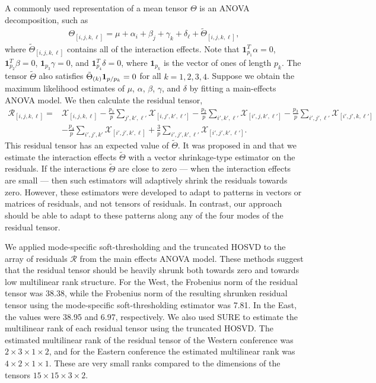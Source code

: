 A commonly used representation of a mean tensor $\Theta$ is an ANOVA
decomposition, such as
\begin{align*}
  \Theta_{[i,j,k,\ell]} = \mu + \alpha_i + \beta_j + \gamma_k + \delta_{\ell} + \tilde{\Theta}_{[i,j,k,\ell]},
\end{align*}
where $\tilde{\Theta}_{[i,j,k,\ell]}$ contains all of the interaction
effects. Note that $\mathbf{1}_{p_1}^T\alpha = 0$,
$\mathbf{1}_{p_2}^T\beta = 0$, $\mathbf{1}_{p_3}\gamma = 0$, and
$\mathbf{1}_{p_4}^T\delta = 0$, where $\mathbf{1}_{p_k}$ is the vector
of ones of length $p_k$. The tensor $\tilde{\Theta}$ also satisfies
$\Tilde{\Theta}_{(k)}\mathbf{1}_{p/p_k} = 0$ for all $k =
1,2,3,4$. Suppose we obtain the maximum likelihood estimates of $\mu$,
$\alpha$, $\beta$, $\gamma$, and $\delta$ by fitting a main-effects
ANOVA model. We then calculate the residual tensor,
\begin{align*}
  \mathcal{R}_{[i,j,k,\ell]} =& \mathcal{X}_{[i,j,k,\ell]} -
  \frac{p_1}{p}\sum_{j',k',\ell'}\mathcal{X}_{[i,j',k',\ell']} -
  \frac{p_2}{p}\sum_{i',k',\ell'}\mathcal{X}_{[i',j,k',\ell']} -
  \frac{p_3}{p}\sum_{i',j',\ell'}\mathcal{X}_{[i',j',k,\ell']} \\
  &- \frac{p_4}{p}\sum_{i',j',k'}\mathcal{X}_{[i',j',k',\ell]} + \frac{3}{p}\sum_{i',j',k',\ell'}\mathcal{X}_{[i',j',k',\ell']}.
\end{align*}
This residual tensor has an expected value of $\tilde{\Theta}$.  It
was proposed in \cite{stein1966approach} and \cite{efron1972empirical}
that we estimate the interaction effects $\tilde{\Theta}$ with a
vector shrinkage-type estimator on the residuals. If the interactions
$\tilde{\Theta}$ are close to zero --- when the interaction effects
are small --- then such estimators will adaptively shrink the
residuals towards zero. However, these estimators were developed to
adapt to patterns in vectors or matrices of residuals, and not tensors
of residuals. In contrast, our approach should be able to adapt to
these patterns along any of the four modes of the residual tensor.

We applied mode-specific soft-thresholding and the truncated HOSVD to
the array of residuals $\mathcal{R}$ from the main effects ANOVA
model. These methods suggest that the residual tensor should be
heavily shrunk both towards zero and towards low multilinear rank
structure. For the West, the Frobenius norm of the residual tensor was
38.38, while the Frobenius norm of the resulting shrunken residual
tensor using the mode-specific soft-thresholding estimator was
7.81. In the East, the values were 38.95 and 6.97, respectively. We
also used SURE to estimate the multilinear rank of each residual
tensor using the truncated HOSVD. The estimated multilinear rank of
the residual tensor of the Western conference was $2 \times 3 \times 1
\times 2$, and for the Eastern conference the estimated multilinear
rank was $4 \times 2 \times 1 \times 1$. These are very small ranks
compared to the dimensions of the tensors $15 \times 15 \times 3
\times 2$.

